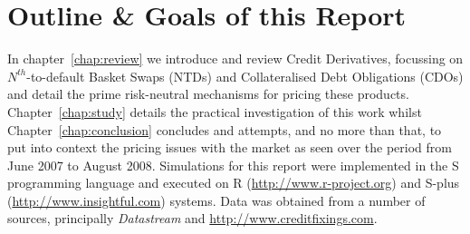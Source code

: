 \section{Outline \& Goals of this Report}

In chapter~\ref{chap:review} we introduce and review Credit Derivatives, focussing on $N^{th}$-to-default Basket Swaps (NTDs) and Collateralised Debt Obligations (CDOs) and detail the prime risk-neutral mechanisms for pricing these products. Chapter~\ref{chap:study} details the practical investigation of this work whilst Chapter~\ref{chap:conclusion} concludes and attempts, and no more than that, to put into context the pricing issues with the market as seen over the period from June 2007 to August 2008.  Simulations for this report were implemented in the S programming language and executed on R 
(\url{http://www.r-project.org})
and S-plus (\url{http://www.insightful.com}) systems. Data was obtained from a number of sources, principally {\em Datastream} and \url{http://www.creditfixings.com}.
